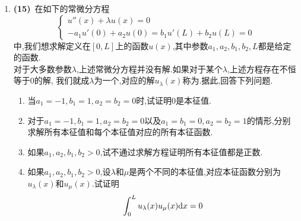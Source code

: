 \documentclass{ctexart}
\begin{document}
\begin{enumerate}[leftmargin=*,label=\textbf{\arabic*.}]
    \item \textbf{(15)}\ 在如下的常微分方程
        \[\left\{\begin{array}{l}
            u''(x)+\lambda u(x)=0\\
            -a_1u'(0)+a_2u(0)=b_1u'(L)+b_2u(L)=0
        \end{array}\right.\]
        中,我们想求解定义在$[0,L]$上的函数$u(x)$,其中参数$a_1,a_2,b_1,b_2,L$都是给定的函数.\\
        对于大多数参数$\lambda$,上述常微分方程并没有解.如果对于某个$\lambda$,上述方程存在不恒等于$0$的解,%
        我们就成$\lambda$为一个,对应的解$u_\lambda(x)$称为.据此,回答下列问题.
        \begin{enumerate}[label=\tbf{(\arabic*)}]
            \item 当$a_1=-1,b_1=1,a_2=b_2=0$时,试证明$0$是本征值.
            \item 对于$a_1=-1,b_1=1,a_2=b_2=0$以及$a_1=b_1=0,a_2=b_2=1$的情形,分别求解所有本征值和每个本征值对应的所有本征函数.
            \item 如果$a_1,a_2,b_1,b_2>0$,试不通过求解方程证明所有本征值都是正数.
            \item 如果$a_1,a_2,b_1,b_2>0$,设$\lambda$和$\mu$是两个不同的本征值,对应本征函数分别为$u_\lambda(x)$和$u_\mu(x)$.试证明
                \[\int_0^Lu_\lambda(x)u_\mu(x)\mathrm{d} x=0\]

        \end{enumerate}
\end{enumerate}
\end{document}
